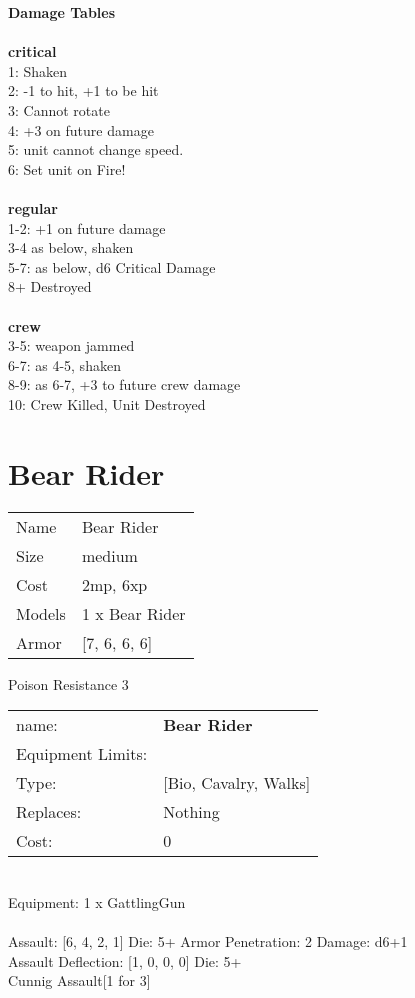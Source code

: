 {\bf Damage Tables} \\
\ \\ {\bf critical } \\
1: Shaken \\
2: -1 to hit, +1 to be hit \\
3: Cannot rotate \\
4: +3 on future damage \\
5: unit cannot change speed. \\
6: Set unit on Fire! \\
\ \\ {\bf regular } \\
1-2: +1 on future damage \\
3-4 as below, shaken \\
5-7: as below, d6 Critical Damage \\
8+ Destroyed \\
\ \\ {\bf crew } \\
3-5: weapon jammed \\
6-7: as 4-5, shaken \\
8-9: as 6-7, +3 to future crew damage \\
10: Crew Killed, Unit Destroyed \\










\pagebreak\pagebreak

\section{ Bear Rider }

\begin{tabular}{ll}
  Name & Bear Rider \\
  Size & medium\\
  Cost & 2mp, 6xp\\
  Models & 1 x Bear Rider\\
  Armor & [7, 6, 6, 6]\\
\end{tabular}

\noindent Poison Resistance 3\\ 


\noindent
\begin{tabular}{ll}
name: &{\bf Bear Rider } \\
Equipment Limits: & \\
Type: &[Bio, Cavalry, Walks] \\
Replaces: &Nothing \\
Cost: & 0\\
\end{tabular}
\ \\
Equipment: 1 x GattlingGun \\
\ \\
Assault: [6, 4, 2, 1] Die: 5+ Armor Penetration: 2 Damage: d6+1 \\
Assault Deflection: [1, 0, 0, 0] Die: 5+\\
\indent Cunnig Assault[1 for 3]\\ 
 
